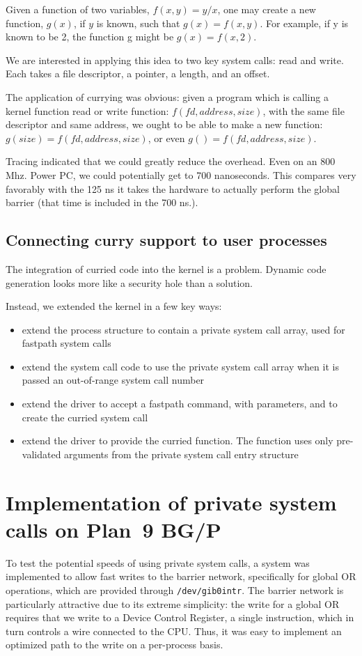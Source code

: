 \documentclass[letterpaper,twocolumn,10pt]{article}
\begin{document}
Given a function of two variables, $ f\left( x, y\right) = y/x$, 
one may create a new function, $g\left( x\right)$, 
if $y$ is known,  such that $g\left( x\right) = f\left( x, y\right)$. 
For example, if y is known to be 2, the function g might be $g\left( x\right) = f\left( x, 2\right)$. 

We are interested in applying this idea to two key system calls: read and write. Each takes a 
file descriptor, a pointer, a length, and an offset. 

The application of currying was obvious: given a program which is calling a kernel function read or write function: $ f\left( fd, address, size\right) $, with 
the same file descriptor and same address, we ought to be able to make a new function: 
$g\left( size\right) = f\left( fd, address, size\right)$, or even 
$g\left( \right) = f\left( fd, address, size\right)$. 

Tracing indicated that we could greatly reduce the overhead. Even on an 800 Mhz. Power PC, we could 
potentially get to 700 nanoseconds. This compares very favorably with the 125 ns it takes the hardware to actually
perform the global barrier (that time is included in the 700 ns.).

\subsection{Connecting curry support to user processes}
The integration of curried code into the kernel is a problem. 
Dynamic code generation looks more like a security
hole than a solution. 

Instead, we extended the kernel in a few key ways: 
\begin{itemize}
\item extend the process structure to contain a private system call array, used for fastpath system calls
\item extend the system call code to use the private system call array when it is passed an out-of-range system 
call number
\item extend the driver to accept a fastpath command, with parameters, and to create the curried system call
\item extend the driver to provide the curried function. The function uses only pre-validated arguments from the private system call entry structure
\end{itemize}

\section{Implementation of private system calls on Plan~9 BG/P}
To test the potential speeds of using private system calls, a system was implemented to allow fast writes to the barrier network, specifically for global OR operations, which are provided through {\tt /dev/gib0intr}. The barrier network is particularly attractive due to its extreme simplicity: the write for a global OR requires that we write to a 
Device Control Register, a single instruction, which in turn controls a
wire connected to the CPU. Thus, it was easy to implement an optimized path to the write on a per-process basis.
\end{document}

